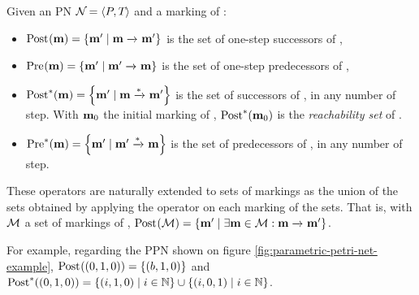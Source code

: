 \begin{defi}
  Given an \ac{PN} $\mathcal{N}_{} = \left\langle P_{}, T_{}\right\rangle$ and a marking \mar of \namePN:
  \begin{itemize}
    \item $\operatorname{Post}_{}(\mathbf{m}) = \left\{\mathbf{m}' \mid \mathbf{m} \xrightarrow{}_{} \mathbf{m}'\right\}$ is the set of one-step successors of \mar,
    \item $\operatorname{Pre}_{}(\mathbf{m}) = \left\{\mathbf{m}' \mid \mathbf{m}' \xrightarrow{}_{} \mathbf{m}\right\}$ is the set of one-step predecessors of \mar,
    \item $\operatorname{Post}^*_{}(\mathbf{m}) = \left\{\mathbf{m'} \mid \mathbf{m} \xrightarrow{*}_{} \mathbf{m'}\right\}$ is the set of successors of \mar, in any number of step.
      With $\mathbf{m}_0$ the initial marking of \namePN, $\operatorname{Post}^*_{}(\mathbf{m}_0)$ is the \emph{reachability set} of \namePN.%
    \item $\operatorname{Pre}^*_{}(\mathbf{m}) = \left\{\mathbf{m'} \mid \mathbf{m'} \xrightarrow{*}_{} \mathbf{m}\right\}$ is the set of predecessors of \mar, in any number of step.
  \end{itemize}
\end{defi}

These operators are naturally extended to sets of markings as the union of the sets obtained by applying the operator on each marking of the sets.
That is, with $\mathcal{M}$ a set of markings of \namePN,
$\operatorname{Post}_{}(\mathcal{M}) = \left\{\mathbf{m'} \mid \exists \mathbf{m} \in \mathcal{M} : \mathbf{m} \xrightarrow{}_{} \mathbf{m'}\right\}$.

For example, regarding the \ac{PPN} shown on figure \ref{fig:parametric-petri-net-example},
$\operatorname{Post}_{}(\left(0,1,0\right)) = \{\left(b, 1, 0\right)\}$
and
$\operatorname{Post}^*_{}(\left(0,1,0\right)) = \left\{\left(i, 1, 0\right) \mid i \in \mathbb{N}\right\} \cup \left\{\left(i, 0, 1\right) \mid i \in \mathbb{N}\right\}$.

